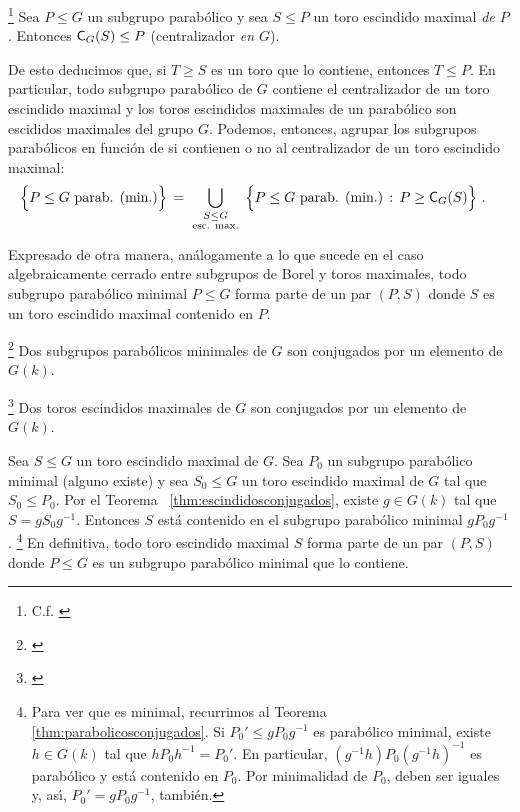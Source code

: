 \begin{teoParabolicosYEscindidos}\label{thm:parabolicosyescindidos}
	\footnote{
		C.f. \cite[Theorem~25.6 (b)]{MilneAlgebraicGroups}
	}
	Sea $P\leq G$ un subgrupo parab\'{o}lico y sea $S\leq P$ un toro
	escindido maximal \emph{de $P$}. Entonces $\centraliza[G](S)\leq P$
	(centralizador \emph{en $G$}).
\end{teoParabolicosYEscindidos}

De esto deducimos que, si $T\geq S$ es un toro que lo contiene, entonces
$T\leq P$. En particular, todo subgrupo parab\'{o}lico de $G$ contiene el
centralizador de un toro escindido maximal y los toros escindidos maximales de
un parab\'{o}lico son escididos maximales del grupo $G$. Podemos, entonces,
agrupar los subgrupos parab\'{o}licos en funci\'{o}n de si contienen o no al
centralizador de un toro escindido maximal:
\begin{align*}
	\Big\{P\leq G\text{ parab. (min.)}\Big\} & \,=\,
		\bigcup_{
			\begin{smallmatrix}
				S\leq G \\[1pt]
				\text{esc. max.}
			\end{smallmatrix}}\,
			\Big\{ P\leq G\text{ parab. (min.)}\,:\,
				P\geq\centraliza[G](S)\Big\}
	\text{ .}
\end{align*}
%

Expresado de otra manera, an\'{a}logamente a lo que sucede en el caso
algebraicamente cerrado entre subgrupos de Borel y toros maximales, todo
subgrupo parab\'{o}lico minimal $P\leq G$ forma parte de un par $(P,S)$ donde
$S$ es un toro escindido maximal contenido en $P$.

\begin{teoParabolicosConjugados}\label{thm:parabolicosconjugados}
	\footnote{
		\cite[Theorem~25.8]{MilneAlgebraicGroups}
	}
	Dos subgrupos parab\'{o}licos minimales de $G$ son conjugados por un
	elemento de $G(k)$.
\end{teoParabolicosConjugados}

\begin{teoEscindidosConjugados}\label{thm:escindidosconjugados}
	\footnote{
		\cite[Theorem~25.10]{MilneAlgebraicGroups}
	}
	Dos toros escindidos maximales de $G$ son conjugados por un elemento de
	$G(k)$.
\end{teoEscindidosConjugados}

Sea $S\leq G$ un toro escindido maximal de $G$. Sea $P_0$ un subgrupo
parab\'{o}lico minimal (alguno existe) y sea $S_0\leq G$ un toro escindido
maximal de $G$ tal que $S_0\leq P_0$. Por el Teorema~%
\ref{thm:escindidosconjugados}, existe $g\in G(k)$ tal que $S=gS_0g^{-1}$.
Entonces $S$ est\'{a} contenido en el subgrupo parab\'{o}lico minimal
$gP_0g^{-1}$.%
\footnote{
	Para ver que es minimal, recurrimos al Teorema~%
	\ref{thm:parabolicosconjugados}. Si $P_0'\leq gP_0g^{-1}$ es
	parab\'{o}lico minimal, existe $h\in G(k)$ tal que $hP_0h^{-1}=P_0'$.
	En particular, $(g^{-1}h)P_0(g^{-1}h)^{-1}$ es parab\'{o}lico y
	est\'{a} contenido en $P_0$. Por minimalidad de $P_0$, deben ser
	iguales y, as\'{\i}, $P_0'=gP_0g^{-1}$, tambi\'{e}n.
}
En definitiva, todo toro escindido maximal $S$ forma parte de un par $(P,S)$
donde $P\leq G$ es un subgrupo parab\'{o}lico minimal que lo contiene.

